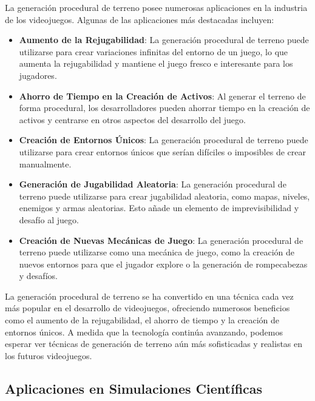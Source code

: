 La generación procedural de terreno posee numerosas aplicaciones en la industria de los videojuegos. Algunas de las aplicaciones más destacadas incluyen:

\begin{itemize}
    \item \textbf{Aumento de la Rejugabilidad}: La generación procedural de terreno puede utilizarse para crear variaciones infinitas del entorno de un juego, lo que aumenta la rejugabilidad y mantiene el juego fresco e interesante para los jugadores\cite{Rejugabilidad}.

    \item \textbf{Ahorro de Tiempo en la Creación de Activos}: Al generar el terreno de forma procedural, los desarrolladores pueden ahorrar tiempo en la creación de activos y centrarse en otros aspectos del desarrollo del juego\cite{AhorroTiempo}.

    \item \textbf{Creación de Entornos Únicos}: La generación procedural de terreno puede utilizarse para crear entornos únicos que serían difíciles o imposibles de crear manualmente\cite{EntornosUnicos}.

    \item \textbf{Generación de Jugabilidad Aleatoria}: La generación procedural de terreno puede utilizarse para crear jugabilidad aleatoria, como mapas, niveles, enemigos y armas aleatorias. Esto añade un elemento de imprevisibilidad y desafío al juego\cite{JugabilidadAleatoria}.

    \item \textbf{Creación de Nuevas Mecánicas de Juego}: La generación procedural de terreno puede utilizarse como una mecánica de juego, como la creación de nuevos entornos para que el jugador explore o la generación de rompecabezas y desafíos\cite{NuevasMecanicas}.
\end{itemize} 

La generación procedural de terreno se ha convertido en una técnica cada vez más popular en el desarrollo de videojuegos, ofreciendo numerosos beneficios como el aumento de la rejugabilidad, el ahorro de tiempo y la creación de entornos únicos. A medida que la tecnología continúa avanzando, podemos esperar ver técnicas de generación de terreno aún más sofisticadas y realistas en los futuros videojuegos.

\subsection{Aplicaciones en Simulaciones Científicas}

